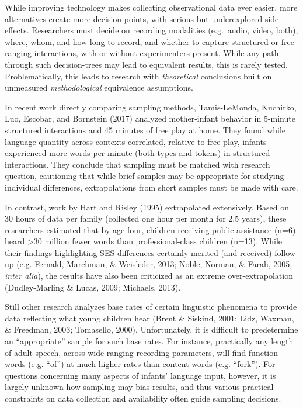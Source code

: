 \documentclass[man]{apa6}
\theoremstyle{definition}
\theoremstyle{definition}
\theoremstyle{definition}
\theoremstyle{remark}
\begin{document}
While improving technology makes collecting observational data ever
easier, more alternatives create more decision-points, with serious but
underexplored side-effects. Researchers must decide on recording
modalities (e.g.~audio, video, both), where, whom, and how long to
record, and whether to capture structured or free-ranging interactions,
with or without experimenters present. While any path through such
decision-trees may lead to equivalent results, this is rarely tested.
Problematically, this leads to research with \emph{theoretical}
conclusions built on unmeasured \emph{methodological} equivalence
assumptions.

In recent work directly comparing sampling methods, Tamis-LeMonda,
Kuchirko, Luo, Escobar, and Bornstein (2017) analyzed mother-infant
behavior in 5-minute structured interactions and 45 minutes of free play
at home. They found while language quantity across contexts correlated,
relative to free play, infants experienced more words per minute (both
types and tokens) in structured interactions. They conclude that
sampling must be matched with research question, cautioning that while
brief samples may be appropriate for studying individual differences,
extrapolations from short samples must be made with care.

In contrast, work by Hart and Risley (1995) extrapolated extensively.
Based on 30 hours of data per family (collected one hour per month for
2.5 years), these researchers estimated that by age four, children
receiving public assistance (n=6) heard \textgreater{}30 million fewer
words than professional-class children (n=13). While their findings
highlighting SES differences certainly merited (and received) follow-up
(e.g. Fernald, Marchman, \& Weisleder, 2013; Noble, Norman, \& Farah,
2005, \emph{inter alia}), the results have also been criticized as an
extreme over-extrapolation (Dudley-Marling \& Lucas, 2009; Michaels,
2013).

Still other research analyzes base rates of certain linguistic phenomena
to provide data reflecting what young children hear (Brent \& Siskind,
2001; Lidz, Waxman, \& Freedman, 2003; Tomasello, 2000). Unfortunately,
it is difficult to predetermine an \enquote{appropriate} sample for such
base rates. For instance, practically any length of adult speech, across
wide-ranging recording parameters, will find function words (e.g.
\enquote{of}) at much higher rates than content words (e.g.
\enquote{fork}). For questions concerning many aspects of infants'
language input, however, it is largely unknown how sampling may bias
results, and thus various practical constraints on data collection and
availability often guide sampling decisions.
\end{document}
